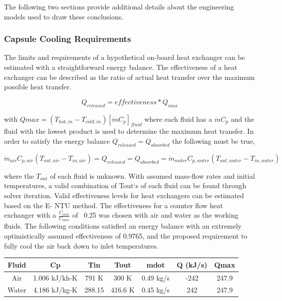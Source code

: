 \documentclass[heading.tex]{subfiles}
\begin{document}
The following two sections provide additional details about the engineering models used to draw these conclusions.

\subsubsection{Capsule Cooling Requirements}

The limits and requirements of a hypothetical on-board heat exchanger can be estimated with a straightforward energy balance. The
effectiveness of a heat exchanger can be described as the ratio of actual heat transfer over the maximum possible heat transfer.

\begin{equation*}
{Q}_{released}  = effectiveness * {Q}_{max}
\end{equation*}


with $Qmax=\left(T_{hot,in} - T_{cold,in}\right) [ \dot{m} C_{p} ]_{fluid}$ where each fluid has a $\dot{m} C_{p}$ and the fluid with the lowest
product is used to determine the maximum heat transfer. In order to satisfy the energy balance $Q_{released}=Q_{absorbed}$ the following must be true,

\begin{equation*}
\dot{m}_{air} C_{p, air} (T_{out, air} - T_{in, air}) = {Q}_{released} = {Q}_{absorbed}= \dot{m}_{water} C_{p,water} (T_{out, water} - T_{in, water})
\end{equation*}

where the $T_{out}$  of each fluid is unknown. With assumed mass-flow rates and initial temperatures, a valid combination of Tout‘s of
each fluid can be found through solver iteration. Valid effectiveness levels for heat exchangers can be estimated based on the E- NTU
method. The effectiveness for a counter flow heat exchanger with a $\frac{C_{min}}{C_{max}}$ of ~0.25 was chosen with air and water as the working fluids. 
The following conditions satisfied an energy balance with an extremely optimistically assumed effectiveness of 0.9765, and the proposed requirement to fully
cool the air back down to inlet temperatures.

\begin{tabular}{|c|c|c|c|c|c|c|}
\hline 
Fluid & Cp & Tin & Tout & mdot & Q (kJ/s) & Qmax \\ 
\hline 
Air & 1.006 kJ/kh-K & 791 K & 300 K & 0.49 kg/s & -242 & 247.9 \\ 
\hline 
Water & 4.186 kJ/kg-K & 288.15 & 416.6 K  & 0.45 kg/s & 242 & 247.9 \\ 
\hline 
\end{tabular} 
\end{document}
